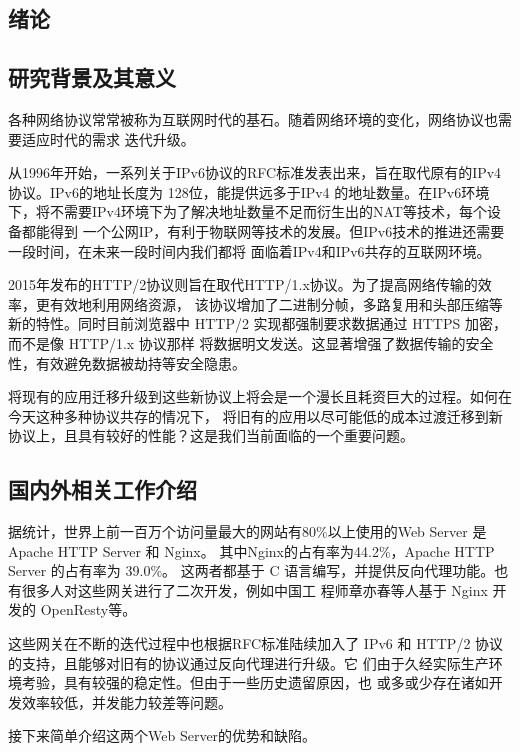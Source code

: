 \documentclass[twoside]{CUGThesis}
\begin{document}
	\makeToc
	
	
	\begin{spacing}{2}
		\section{绪论}
	\end{spacing}
	\subsection{研究背景及其意义}
	各种网络协议常常被称为互联网时代的基石。随着网络环境的变化，网络协议也需要适应时代的需求
	迭代升级。\par
	从1996年开始，一系列关于IPv6协议的RFC标准发表出来，旨在取代原有的IPv4协议。IPv6的地址长度为
	128位，能提供远多于IPv4 的地址数量。在IPv6环境下，将不需要IPv4环境下为了解决地址数量不足而衍生出的NAT等技术，每个设备都能得到
	一个公网IP，有利于物联网等技术的发展。但IPv6技术的推进还需要一段时间，在未来一段时间内我们都将
	面临着IPv4和IPv6共存的互联网环境。\par
		2015年发布的HTTP/2协议则旨在取代HTTP/1.x协议。为了提高网络传输的效率，更有效地利用网络资源，
	该协议增加了二进制分帧，多路复用和头部压缩等新的特性。同时目前浏览器中 HTTP/2 
	实现都强制要求数据通过 HTTPS 加密，而不是像 HTTP/1.x 协议那样
	将数据明文发送。这显著增强了数据传输的安全性，有效避免数据被劫持等安全隐患。\par
	将现有的应用迁移升级到这些新协议上将会是一个漫长且耗资巨大的过程。如何在今天这种多种协议共存的情况下，
	将旧有的应用以尽可能低的成本过渡迁移到新协议上，且具有较好的性能？这是我们当前面临的一个重要问题。\par
	

	\subsection{国内外相关工作介绍}
	据统计，世界上前一百万个访问量最大的网站有80\%以上使用的Web Server 是 Apache HTTP Server 和 Nginx。
	其中Nginx的占有率为44.2\%，Apache HTTP Server 的占有率为 39.0\%\cite{marques2018learning}。
	这两者都基于 C 语言编写，并提供反向代理功能。也有很多人对这些网关进行了二次开发，例如中国工 程师章亦春等人基于 Nginx 开发的 OpenResty\cite{OpenResty}等。\par
这些网关在不断的迭代过程中也根据RFC标准陆续加入了 IPv6 和 HTTP/2 协议的支持，且能够对旧有的协议通过反向代理进行升级。它 们由于久经实际生产环境考验，具有较强的稳定性。但由于一些历史遗留原因，也 或多或少存在诸如开发效率较低，并发能力较差等问题。\par 
接下来简单介绍这两个Web Server的优势和缺陷。
\end{document}
